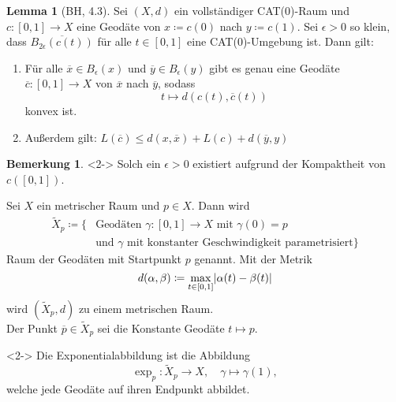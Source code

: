 \documentclass{beamer}
\newcommand{\I}{\left[0,1\right]} %
\renewcommand{\emph}[1]{\textcolor{Emph}{#1}}
\DeclarePairedDelimiter\abs{\lvert}{\rvert}%
\theoremstyle{definition}
\newtheorem*{lem}{Lemma}
\newtheorem*{bem}{Bemerkung}
\begin{document}
\begin{frame}
  \begin{lem}[BH, 4.3]
    Sei $(X, d)$ ein vollständiger CAT($0$)-Raum und $c : \I \to X$ eine Geodäte von $x \coloneqq c(0)$ nach $y \coloneqq c(1)$. Sei $\epsilon > 0$ so klein, dass $\overline{B_{2 \epsilon}(c(t))}$ für alle $t \in \I$ eine CAT($0$)-Umgebung ist. Dann gilt:
    \begin{enumerate}
      \item Für alle $\overline{x} \in B_\epsilon(x)$ und $\overline{y} \in B_\epsilon(y)$ gibt es genau eine Geodäte $\overline{c} : \I \to X$ von $\overline{x}$ nach $\overline{y}$, sodass
      \[ t \mapsto d(c(t), \overline{c}(t)) \]
      konvex ist.
      \item Außerdem gilt: $L(\overline{c}) \leq d(x, \overline{x}) + L(c) + d(\overline{y}, y)$
    \end{enumerate}
  \end{lem}

  \begin{bem}<2->
    Solch ein $\epsilon > 0$ existiert aufgrund der Kompaktheit von $c(\I)$.
  \end{bem}
\end{frame}

\begin{frame}
  \begin{definition}
    Sei $X$ ein metrischer Raum und $p \in X$. Dann wird
    \begin{align*}
      \tilde{X}_p \coloneqq \{ &\text{Geodäten } \gamma : \I \to X \text{ mit } \gamma(0) = p\\
      &\text{und $\gamma$ mit konstanter Geschwindigkeit parametrisiert} \}
    \end{align*}
    \emph{Raum der Geodäten mit Startpunkt $p$} genannt. Mit der Metrik
    \[ d(\alpha, \beta) \coloneqq \max_{t \in \I} \abs{\alpha(t) - \beta(t)} \]
    wird $(\tilde{X}_p, d)$ zu einem metrischen Raum.\\
    Der Punkt $\overline{p} \in \tilde{X}_p$ sei die Konstante Geodäte $t \mapsto p$.
  \end{definition}

  \begin{definition}<2->
    Die \emph{Exponentialabbildung} ist die Abbildung
    \[ \exp_p : \tilde{X}_p \to X, \quad \gamma \mapsto \gamma(1), \]
    welche jede Geodäte auf ihren Endpunkt abbildet.
  \end{definition}
\end{frame}
\end{document}
